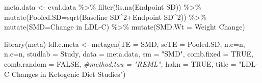\documentclass[
]{article}
\newenvironment{Shaded}{\begin{snugshade}}{\end{snugshade}}
\newcommand{\AttributeTok}[1]{\textcolor[rgb]{0.77,0.63,0.00}{#1}}
\newcommand{\CommentTok}[1]{\textcolor[rgb]{0.56,0.35,0.01}{\textit{#1}}}
\newcommand{\ConstantTok}[1]{\textcolor[rgb]{0.00,0.00,0.00}{#1}}
\newcommand{\DecValTok}[1]{\textcolor[rgb]{0.00,0.00,0.81}{#1}}
\newcommand{\FunctionTok}[1]{\textcolor[rgb]{0.00,0.00,0.00}{#1}}
\newcommand{\NormalTok}[1]{#1}
\newcommand{\OtherTok}[1]{\textcolor[rgb]{0.56,0.35,0.01}{#1}}
\newcommand{\SpecialCharTok}[1]{\textcolor[rgb]{0.00,0.00,0.00}{#1}}
\newcommand{\StringTok}[1]{\textcolor[rgb]{0.31,0.60,0.02}{#1}}
\begin{document}
\begin{Shaded}
\begin{Highlighting}[]
\NormalTok{meta.data }\OtherTok{\textless{}{-}}
\NormalTok{  eval.data }\SpecialCharTok{\%\textgreater{}\%}
  \FunctionTok{filter}\NormalTok{(}\SpecialCharTok{!}\FunctionTok{is.na}\NormalTok{(}\StringTok{\textasciigrave{}}\AttributeTok{Endpoint SD}\StringTok{\textasciigrave{}}\NormalTok{)) }\SpecialCharTok{\%\textgreater{}\%}
  \FunctionTok{mutate}\NormalTok{(}\AttributeTok{Pooled.SD=}\FunctionTok{sqrt}\NormalTok{(}\StringTok{\textasciigrave{}}\AttributeTok{Baseline SD}\StringTok{\textasciigrave{}}\SpecialCharTok{\^{}}\DecValTok{2}\SpecialCharTok{+}\StringTok{\textasciigrave{}}\AttributeTok{Endpoint SD}\StringTok{\textasciigrave{}}\SpecialCharTok{\^{}}\DecValTok{2}\NormalTok{)) }\SpecialCharTok{\%\textgreater{}\%}
  \FunctionTok{mutate}\NormalTok{(}\AttributeTok{SMD=}\StringTok{\textasciigrave{}}\AttributeTok{Change in LDL{-}C}\StringTok{\textasciigrave{}}\NormalTok{) }\SpecialCharTok{\%\textgreater{}\%}
  \FunctionTok{mutate}\NormalTok{(}\AttributeTok{SMD.Wt =} \StringTok{\textasciigrave{}}\AttributeTok{Weight Change}\StringTok{\textasciigrave{}}\NormalTok{) }

\FunctionTok{library}\NormalTok{(meta)}
\NormalTok{ldl.c.meta }\OtherTok{\textless{}{-}} \FunctionTok{metagen}\NormalTok{(}\AttributeTok{TE =}\NormalTok{ SMD,}
                 \AttributeTok{seTE =}\NormalTok{ Pooled.SD,}
                 \AttributeTok{n.e=}\NormalTok{n,}
                 \AttributeTok{n.c=}\NormalTok{n,}
                 \AttributeTok{studlab =}\NormalTok{ Study,}
                 \AttributeTok{data =}\NormalTok{ meta.data,}
                 \AttributeTok{sm =} \StringTok{"SMD"}\NormalTok{,}
                 \AttributeTok{comb.fixed =} \ConstantTok{TRUE}\NormalTok{,}
                 \AttributeTok{comb.random =} \ConstantTok{FALSE}\NormalTok{,}
                 \CommentTok{\#method.tau = "REML",}
                 \AttributeTok{hakn =} \ConstantTok{TRUE}\NormalTok{,}
                 \AttributeTok{title =} \StringTok{"LDL{-}C Changes in Ketogenic Diet Studies"}\NormalTok{)}


\end{Highlighting}
\end{Shaded}
\end{document}
